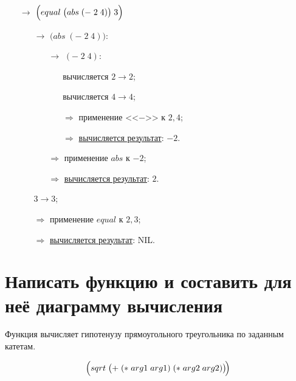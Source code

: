 \begin{itemize}
	\item[$\longrightarrow$] $\Bigl(equal\; \bigl(abs\; (-\; 2\; 4)\bigr)\; 3\Bigr)$
	\begin{itemize}
		\item[$\longrightarrow$] $\bigl(abs\; (-\; 2\; 4)\bigr)$:
		\begin{itemize}
			\item[$\longrightarrow$] $(-\; 2\; 4)$:
			\begin{itemize}
				\item[\textbullet] вычисляется $2 \to 2$;
				\item[\textbullet] вычисляется $4 \to 4$;
				\item[$\Longrightarrow$] применение <<$-$>> к $2, 4$;
				\item[$\Longrightarrow$] \underline{вычисляется результат}: $-2$.
			\end{itemize}
			\item[$\Longrightarrow$] применение $abs$ к $-2$;
			\item[$\Longrightarrow$] \underline{вычисляется результат}: $2$.
		\end{itemize}
		\item[\textbullet] $3 \to 3$;
		\item[$\Longrightarrow$] применение $equal$ к $2, 3$;
		\item[$\Longrightarrow$] \underline{вычисляется результат}: NIL.
	\end{itemize}
\end{itemize}
\vfill



\section{Написать функцию и составить для неё диаграмму вычисления}

\problem Функция вычисляет гипотенузу прямоугольного треугольника по заданным катетам.
\vfill

\vfill

\[
	\Bigl(sqrt\; \bigl(+\; (*\; arg1\; arg1)\; (*\; arg2\; arg2)\bigr)\!\Bigr)
\]
\vfill

